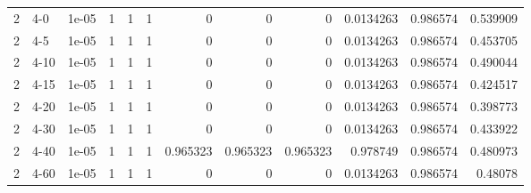 \begin{tabular}{rlrrrrrrrrrr}
     2 & 4-0    &      1e-05 &           1 &                 1 &                 1 &        0        &        0        &         0        &        0.0134263 &               0.986574 &           0.539909 \\
     2 & 4-5    &      1e-05 &           1 &                 1 &                 1 &        0        &        0        &         0        &        0.0134263 &               0.986574 &           0.453705 \\
     2 & 4-10   &      1e-05 &           1 &                 1 &                 1 &        0        &        0        &         0        &        0.0134263 &               0.986574 &           0.490044 \\
     2 & 4-15   &      1e-05 &           1 &                 1 &                 1 &        0        &        0        &         0        &        0.0134263 &               0.986574 &           0.424517 \\
     2 & 4-20   &      1e-05 &           1 &                 1 &                 1 &        0        &        0        &         0        &        0.0134263 &               0.986574 &           0.398773 \\
     2 & 4-30   &      1e-05 &           1 &                 1 &                 1 &        0        &        0        &         0        &        0.0134263 &               0.986574 &           0.433922 \\
     2 & 4-40   &      1e-05 &           1 &                 1 &                 1 &        0.965323 &        0.965323 &         0.965323 &        0.978749  &               0.986574 &           0.480973 \\
     2 & 4-60   &      1e-05 &           1 &                 1 &                 1 &        0        &        0        &         0        &        0.0134263 &               0.986574 &           0.48078  \\
\hline
\end{tabular}
